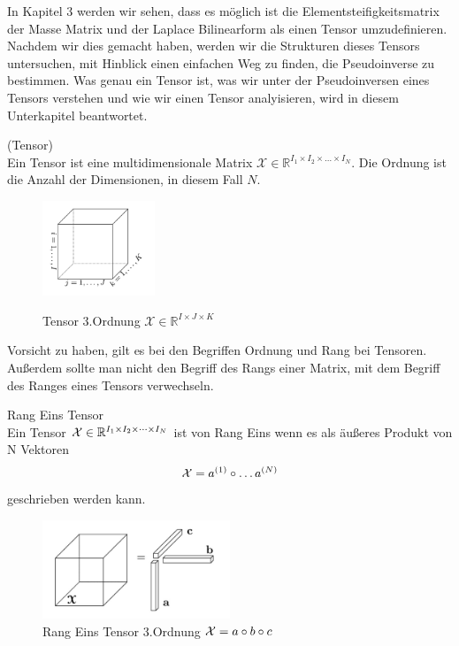 In Kapitel 3 werden wir sehen, dass es möglich ist die Elementsteifigkeitsmatrix der Masse Matrix und der Laplace Bilinearform als einen Tensor umzudefinieren. Nachdem wir dies gemacht haben, werden wir die Strukturen dieses Tensors untersuchen, mit Hinblick einen einfachen Weg zu finden, die Pseudoinverse zu bestimmen. Was genau ein Tensor ist, was wir unter der Pseudoinversen eines Tensors verstehen und wie wir einen Tensor analyisieren, wird in diesem Unterkapitel beantwortet.


\begin{Definition} (Tensor) \\
Ein Tensor ist eine multidimensionale Matrix $\pmb{\mathscr{X}}  \in \mathbb{R}^{I_1 \times I_2 \times \dots \times I_N}$.
Die Ordnung ist die Anzahl der Dimensionen, in diesem Fall $N$.
\end{Definition}

\begin{figure}[ht]
	\centering
  \includegraphics[width=0.3\textwidth]{tensorOrdnung3.png}
	\caption{Tensor 3.Ordnung $\pmb{\mathscr{X}}  \in \mathbb{R}^{I \times J \times K}$} \cite[456]{Kolda}
	\label{fig:tensorOrdnung3}
\end{figure}

Vorsicht zu haben, gilt es bei den Begriffen Ordnung und Rang bei Tensoren. Außerdem sollte man nicht den Begriff des Rangs einer Matrix, mit dem Begriff des Ranges eines Tensors verwechseln. 

\begin{Definition} Rang Eins Tensor \\
Ein Tensor ${\cal X}  \in \mathbb{R}^{I_1 \times I_2 \times \dots \times I_N}$ ist von Rang Eins wenn es als äußeres Produkt von N Vektoren
\begin{equation*}
{\cal{X}} = a^{(1)} \circ \dots a^{(N)}
\end{equation*}
geschrieben werden kann.
\end{Definition}

\begin{figure}[ht]
	\centering
  \includegraphics[width=0.5\textwidth]{rang1Tensor.png}
	\caption{Rang Eins Tensor 3.Ordnung ${\cal X}  = a \circ b \circ c$}
	\label{fig:rang1Tensor}
\end{figure}

